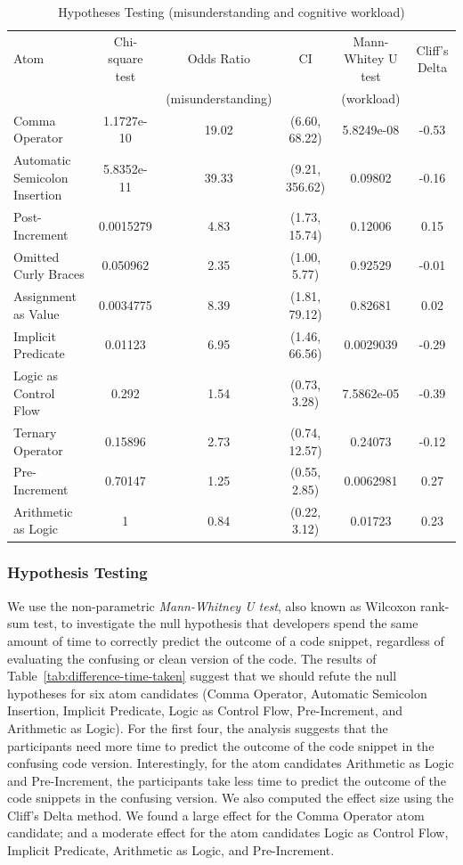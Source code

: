  \begin{table}[ht]
\caption{Hypotheses Testing (misunderstanding and cognitive workload)}

 \centering
 \begin{tabular}{lccc|cc}
   \toprule
Atom  & Chi-square test & Odds Ratio          & CI & Mann-Whitey U test & Cliff's Delta \\ 
     &         & (misunderstanding)  &                    & (workload)             & \\ \midrule
Comma Operator & 1.1727e-10 & 19.02 & (6.60, 68.22) & 5.8249e-08 & -0.53 \\ 
Automatic Semicolon Insertion & 5.8352e-11 & 39.33 & (9.21, 356.62) & 0.09802 & -0.16 \\ 
Post-Increment & 0.0015279 & 4.83 & (1.73, 15.74) & 0.12006 & 0.15 \\ 
Omitted Curly Braces & 0.050962 & 2.35 & (1.00, 5.77) & 0.92529 & -0.01 \\ 
Assignment as Value & 0.0034775 & 8.39 & (1.81, 79.12) & 0.82681 & 0.02 \\ 
Implicit Predicate & 0.01123 & 6.95 & (1.46, 66.56) & 0.0029039 & -0.29 \\ 
Logic as Control Flow & 0.292 & 1.54 & (0.73, 3.28) & 7.5862e-05 & -0.39 \\ 
Ternary Operator & 0.15896 & 2.73 & (0.74, 12.57) & 0.24073 & -0.12 \\ 
Pre-Increment & 0.70147 & 1.25 & (0.55, 2.85) & 0.0062981 & 0.27 \\ 
Arithmetic as Logic & 1 & 0.84 & (0.22, 3.12) & 0.01723 & 0.23 \\ 
    \bottomrule
 \end{tabular}
 \label{tab:hypothesis-testing}
 \end{table}


\subsubsection*{Hypothesis Testing}
We use the non-parametric \emph{Mann-Whitney U test}, also known as Wilcoxon rank-sum test, to
investigate the null hypothesis that developers 
spend the same amount of time to correctly
predict the outcome of a code snippet, regardless
of evaluating the confusing or  clean version
of the code. The results of Table~\ref{tab:difference-time-taken}
suggest that we should refute the null hypotheses for
six atom candidates (Comma Operator, Automatic Semicolon Insertion,
Implicit Predicate, Logic
as Control Flow, Pre-Increment, and Arithmetic
as Logic). For the first four, the analysis suggests that the participants
need more time to predict the outcome of
the code snippet in the confusing code version. Interestingly, for the atom candidates Arithmetic as Logic and Pre-Increment, the participants take less time
to predict the outcome of the code snippets in
the confusing version.
We also computed the effect size using the Cliff's Delta method. We found a large effect for the Comma Operator atom candidate; and a moderate effect for the atom candidates
Logic as Control Flow, Implicit Predicate, Arithmetic
as Logic, and Pre-Increment. 


